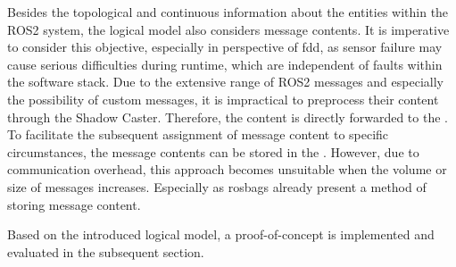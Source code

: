         Besides the topological and continuous information about the entities within the ROS2 system, the logical model also considers message contents. It is imperative to consider this objective, especially in perspective of \acl{fdd}, as sensor failure may cause serious difficulties during runtime, which are independent of faults within the software stack. Due to the extensive range of ROS2 messages and especially the possibility of custom messages, it is impractical to preprocess their content through the Shadow Caster. Therefore, the content is directly forwarded to the . To facilitate the subsequent assignment of message content to specific circumstances, the message contents can be stored in the . However, due to communication overhead, this approach becomes unsuitable when the volume or size of messages increases. Especially as rosbags \cite{website:rosbag} already present a method of storing message content.

Based on the introduced logical model, a proof-of-concept is implemented and evaluated in the subsequent section.